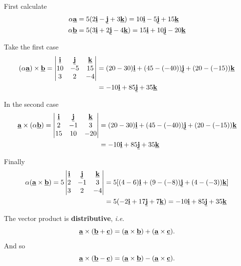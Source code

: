 \begin{solution}
First calculate 
\begin{align*}
    \alpha\myvec{a} &= 5(2\myvec{i}-\myvec{j} + 3\myvec{k}) = 10\myvec{i} - 5\myvec{j} + 15\myvec{k} \\
    \alpha\myvec{b} &= 5(3\myvec{i} + 2\myvec{j} - 4\myvec{k}) = 15\myvec{i} + 10\myvec{j} - 20\myvec{k}
\end{align*}

Take the first case
\begin{align*}
    (\alpha\myvec{a})\times\myvec{b}
= \begin{vmatrix}\myvec{i}&\myvec{j}&\myvec{k}\\10&-5&15\\3&2&-4\end{vmatrix}
&=\blank{(20-30)\myvec{i}+(45-(-40))\myvec{j}+(20-(-15))\myvec{k}}\\
&=\blank{-10\myvec{i}+85\myvec{j}+35\myvec{k}}
\end{align*}

In the second case
\begin{align*}
\myvec{a}\times(\alpha\myvec{b})
= \begin{vmatrix}\myvec{i}&\myvec{j}&\myvec{k}\\2&-1&3\\15&10&-20\end{vmatrix}
&=\blank{(20-30)\myvec{i}+(45-(-40))\myvec{j}+(20-(-15))\myvec{k}}\\
&= \blank{-10\myvec{i}+85\myvec{j}+35\myvec{k}}
\end{align*}

Finally
\begin{align*}
    \alpha(\myvec{a}\times\myvec{b})
= 5\begin{vmatrix}\myvec{i}&\myvec{j}&\myvec{k}\\2&-1&3\\3&2&-4\end{vmatrix}
&=\blank{5[(4-6)\myvec{i}+(9-(-8))\myvec{j}+(4-(-3))\myvec{k}]}\\
&=\blank{5(-2\myvec{i}+17\myvec{j}+7\myvec{k}) = -10\myvec{i}+85\myvec{j}+35\myvec{k}}
\end{align*}
\end{solution}

The vector product is \textbf{distributive}, \textit{i.e}.
\begin{equation}
    \myvec{a}\times(\myvec{b}+\myvec{c})
=(\myvec{a}\times\myvec{b})+(\myvec{a}\times\myvec{c}).
\end{equation}
And so
\[
\myvec{a}\times(\myvec{b}-\myvec{c})
=(\myvec{a}\times\myvec{b})-(\myvec{a}\times\myvec{c}).
\]

